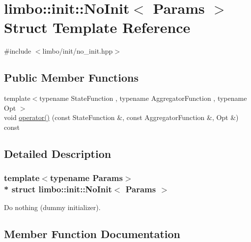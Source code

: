 \hypertarget{structlimbo_1_1init_1_1_no_init}{}\section{limbo\+:\+:init\+:\+:No\+Init$<$ Params $>$ Struct Template Reference}
\label{structlimbo_1_1init_1_1_no_init}


{\ttfamily \#include $<$limbo/init/no\+\_\+init.\+hpp$>$}

\subsection*{Public Member Functions}
\begin{DoxyCompactItemize}
\item 
{\footnotesize template$<$typename State\+Function , typename Aggregator\+Function , typename Opt $>$ }\\void \hyperlink{structlimbo_1_1init_1_1_no_init_a9fa7394b1924bd1f3f8f9f7d27d582ee}{operator()} (const State\+Function \&, const Aggregator\+Function \&, Opt \&) const 
\end{DoxyCompactItemize}


\subsection{Detailed Description}
\subsubsection*{template$<$typename Params$>$\\*
struct limbo\+::init\+::\+No\+Init$<$ Params $>$}

Do nothing (dummy initializer). 

\subsection{Member Function Documentation}
